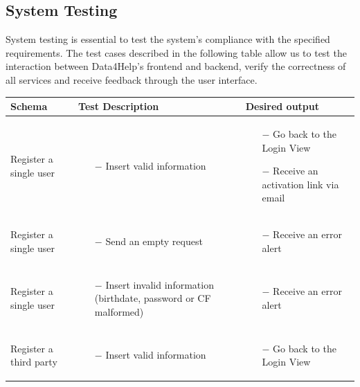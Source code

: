\documentclass[titlepage]{article}
\begin{document}
	\subsection{System Testing}
	System testing is essential to test the system's compliance with the specified requirements. The test cases described in the following table allow us to test the interaction between Data4Help's frontend and backend, verify the correctness of all services and receive feedback through the user interface.
	\begin{longtable}{| p{3 cm} | p{4 cm} | p{4 cm} |} \hline
		{\bf Schema} & {\bf Test Description} & {\bf Desired output} \\ \hline
		Register a single user & \begin{itemize}[nolistsep]
			\item[$-$] Insert valid information
		\end{itemize}
		& \begin{itemize}[nolistsep]
			\item[$-$] Go back to the Login View
			\item[$-$] Receive an activation link via email
		\end{itemize} \\ \hline
		Register a single user & \begin{itemize}[nolistsep]
			\item[$-$] Send an empty request
		\end{itemize}
		& \begin{itemize}[nolistsep]
			\item[$-$] Receive an error alert
		\end{itemize} \\ \hline
		Register a single user & \begin{itemize}[nolistsep]
			\item[$-$] Insert invalid information (birthdate, password or CF malformed)
		\end{itemize}
		& \begin{itemize}[nolistsep]
			\item[$-$] Receive an error alert
		\end{itemize} \\ \hline
		Register a third party & \begin{itemize}[nolistsep]
			\item[$-$] Insert valid information
		\end{itemize}
		& \begin{itemize}[nolistsep]
			\item[$-$] Go back to the Login View

\end{itemize}
\end{longtable}
\end{document}
